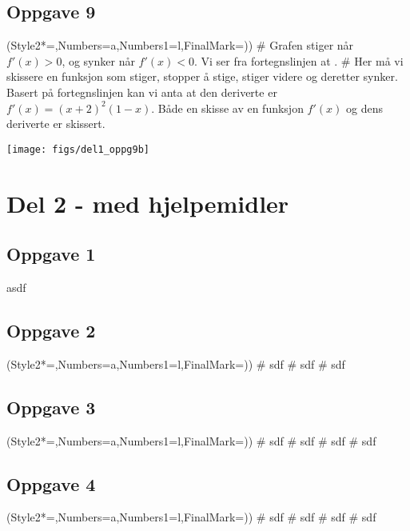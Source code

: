 \subsection*{Oppgave 9}
\begin{easylist}[enumerate]
	\ListProperties(Style2*=,Numbers=a,Numbers1=l,FinalMark={)})
	# Grafen stiger når $f'(x) > 0$, og synker når $f'(x) < 0$.
	Vi ser fra fortegnslinjen at .
	# Her må vi skissere en funksjon som stiger, stopper å stige, stiger videre og deretter synker. Basert på fortegnslinjen kan vi anta at den deriverte er $f'(x) = (x+2)^2 (1-x)$. Både en skisse av en funksjon $f'(x)$ og dens deriverte er skissert.
	\begin{center}
		\texttt{[image: figs/del1\_oppg9b]}
	\end{center}
\end{easylist}



\section*{Del 2 - med hjelpemidler}


\subsection*{Oppgave 1}
asdf

\subsection*{Oppgave 2}
\begin{easylist}[enumerate]
	\ListProperties(Style2*=,Numbers=a,Numbers1=l,FinalMark={)})
	# sdf
	# sdf
	# sdf
\end{easylist}


\subsection*{Oppgave 3}
\begin{easylist}[enumerate]
	\ListProperties(Style2*=,Numbers=a,Numbers1=l,FinalMark={)})
	# sdf
	# sdf
	# sdf
	# sdf
\end{easylist}

\subsection*{Oppgave 4}
\begin{easylist}[enumerate]
	\ListProperties(Style2*=,Numbers=a,Numbers1=l,FinalMark={)})
	# sdf
	# sdf
	# sdf
	# sdf
\end{easylist}




